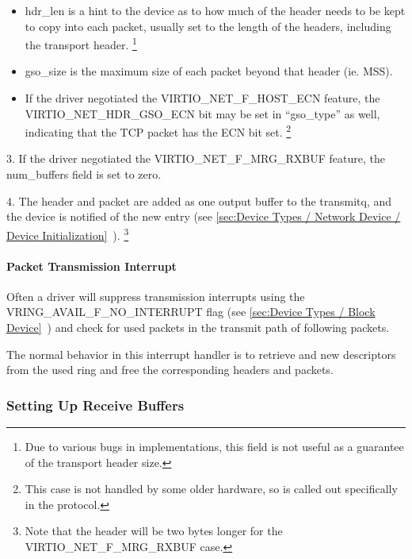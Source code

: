 \begin{itemize}
  \item hdr_len is a hint to the device as to how much of the header
    needs to be kept to copy into each packet, usually set to the
    length of the headers, including the transport header.
\footnote{Due to various bugs in implementations, this field is not useful
as a guarantee of the transport header size.
}

  \item gso_size is the maximum size of each packet beyond that
    header (ie. MSS).

  \item If the driver negotiated the VIRTIO_NET_F_HOST_ECN feature,
    the VIRTIO_NET_HDR_GSO_ECN bit may be set in “gso_type” as
    well, indicating that the TCP packet has the ECN bit set.
\footnote{This case is not handled by some older hardware, so is called out
specifically in the protocol.
}
\end{itemize}

3. If the driver negotiated the VIRTIO_NET_F_MRG_RXBUF feature,
  the num_buffers field is set to zero.

4. The header and packet are added as one output buffer to the
  transmitq, and the device is notified of the new entry
  (see \ref{sec:Device Types / Network Device / Device Initialization}~).
\footnote{Note that the header will be two bytes longer for the
VIRTIO_NET_F_MRG_RXBUF case.
}

\paragraph{Packet Transmission Interrupt}\label{sec:Device Types / Network Device / Device Operation / Packet Transmission / Packet Transmission Interrupt}

Often a driver will suppress transmission interrupts using the
VRING_AVAIL_F_NO_INTERRUPT flag
 (see \ref{sec:Device Types / Block Device}~)
and check for used packets in the transmit path of following
packets.

The normal behavior in this interrupt handler is to retrieve and
new descriptors from the used ring and free the corresponding
headers and packets.

\subsubsection{Setting Up Receive Buffers}\label{sec:Device Types / Network Device / Device Operation / Setting Up Receive Buffers}


